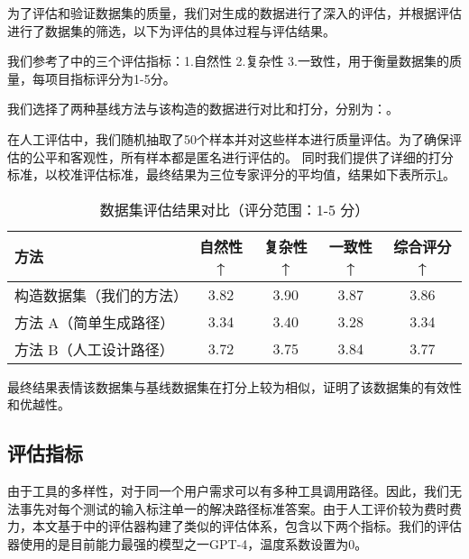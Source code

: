 为了评估和验证数据集的质量，我们对生成的数据进行了深入的评估，并根据评估进行了数据集的筛选，以下为评估的具体过程与评估结果。

我们参考了\cite{shen2023taskbench}中的三个评估指标：1.自然性 2.复杂性 3.一致性，用于衡量数据集的质量，每项目指标评分为1-5分。

我们选择了两种基线方法与该构造的数据进行对比和打分，分别为：。

在人工评估中，我们随机抽取了50个样本并对这些样本进行质量评估。为了确保评估的公平和客观性，所有样本都是匿名进行评估的。
同时我们提供了详细的打分标准，以校准评估标准，最终结果为三位专家评分的平均值，结果如下表所示\ref{tab:comparison}。

\begin{table}[h]
  \centering
  \caption{数据集评估结果对比（评分范围：1-5 分）}
  \label{tab:comparison}
  \begin{tabular}{l|c|c|c|c}
  \toprule
  \textbf{方法}               & \textbf{自然性↑} & \textbf{复杂性↑} & \textbf{一致性↑} & \textbf{综合评分↑} \\ \midrule
  构造数据集（我们的方法）   & 3.82             & 3.90             & 3.87             & 3.86              \\ \hline
  方法 A（简单生成路径）      & 3.34             & 3.40             & 3.28             & 3.34              \\ \hline
  方法 B（人工设计路径）      & 3.72             & 3.75             & 3.84             & 3.77              \\ 
  \bottomrule
  \end{tabular}
\end{table}

最终结果表情该数据集与基线数据集在打分上较为相似，证明了该数据集的有效性和优越性。

\subsection{评估指标}
由于工具的多样性，对于同一个用户需求可以有多种工具调用路径。因此，我们无法事先对每个测试的输入标注单一的解决路径标准答案。由于人工评价较为费时费力，本文基于\cite{Tang2023}中的评估器构建了类似的评估体系，包含以下两个指标。我们的评估器使用的是目前能力最强的模型之一GPT-4，温度系数设置为0。

